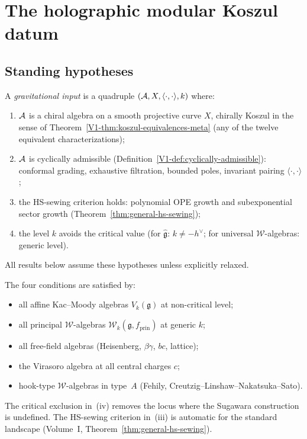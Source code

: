 \section{The holographic modular Koszul datum}

\subsection{Standing hypotheses}

\begin{definition}
\label{def:thqg-standing-hypotheses}
A \emph{gravitational input} is a quadruple $(\mathcal{A}, X, \langle\cdot,\cdot\rangle, k)$ where:
\begin{enumerate}[label=\textup{(\roman*)}]
\item $\mathcal{A}$ is a chiral algebra on a smooth projective curve $X$, chirally Koszul
 in the sense of Theorem~\ref*{V1-thm:koszul-equivalences-meta} (any of the twelve
 equivalent characterizations);
\item $\mathcal{A}$ is cyclically admissible
 (Definition~\ref{V1-def:cyclically-admissible}): conformal grading, exhaustive
 filtration, bounded poles, invariant pairing $\langle\cdot,\cdot\rangle$;
\item the HS-sewing criterion holds: polynomial OPE growth and
 subexponential sector growth (Theorem~\ref{thm:general-hs-sewing});
\item the level $k$ avoids the critical value (for $\widehat{\mathfrak{g}}$:
 $k \ne -h^\vee$; for universal $\mathcal{W}$-algebras: generic level).
\end{enumerate}
All results below assume these hypotheses unless explicitly relaxed.
\end{definition}

\begin{remark}
The four conditions are satisfied by:
\begin{itemize}
\item all affine Kac--Moody algebras $V_k(\mathfrak{g})$ at non-critical level;
\item all principal $\mathcal{W}$-algebras $\mathcal{W}_k(\mathfrak{g}, f_{\mathrm{prin}})$ at generic $k$;
\item all free-field algebras (Heisenberg, $\beta\gamma$, $bc$, lattice);
\item the Virasoro algebra at all central charges $c$;
\item hook-type $\mathcal{W}$-algebras in type~$A$ (Fehily, Creutzig--Linshaw--Nakatsuka--Sato).
\end{itemize}
The critical exclusion in~(iv) removes the locus where the Sugawara construction is undefined.
The HS-sewing criterion in~(iii) is automatic for the standard landscape
(Volume~I, Theorem~\ref{thm:general-hs-sewing}).
\end{remark}


